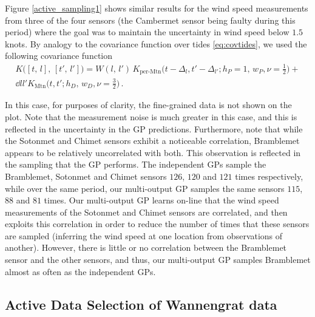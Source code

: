 \documentclass{acmtrans2m}
\newcommand{\dnt}[1]{_{{#1}}}
\newcommand{\Kl}[1]{K_{\text{#1}}}
\begin{document}
Figure \ref{active_sampling1} shows similar results for the wind speed measurements from three of the four sensors (the Cambermet sensor being faulty during this period) where the goal was to maintain the uncertainty in wind speed below $1.5$ knots. By analogy to the covariance function over tides \eqref{eq:covtides}, we used the following covariance function
\begin{multline*} %
 K\bigl([t,\,l],\,[t',\,l']\bigr)={W}(l,\,l')\,
\Kl{per-Mtn}\bigl(t-\Delta_{l},t'-\Delta_{l'};h\dnt{P}=1,\,w_P,\nu=\tfrac{1}{2}\bigr)+
\\
\dd{l}{l'}\Kl{Mtn}\bigl(t,t';h\dnt{D},\,w\dnt{D},\nu=\tfrac{3}{2}\bigr)
\,.
\end{multline*}

In this case, for purposes of clarity, the fine-grained data is not shown on the plot. Note that the measurement noise is much greater in this case, and this is reflected in the uncertainty in the GP predictions. Furthermore, note that while the Sotonmet and Chimet sensors exhibit a noticeable correlation, Bramblemet appears to be relatively uncorrelated with both. This observation is reflected in the sampling that the GP performs. The independent GPs sample the Bramblemet, Sotonmet and Chimet sensors $126$, $120$ and $121$ times respectively, while over the same period, our multi-output GP samples the same sensors $115$, $88$ and $81$ times. Our multi-output GP learns on-line that the wind speed measurements of the Sotonmet and Chimet sensors are correlated, and then exploits this correlation in order to reduce the number of times that these sensors are sampled (inferring the wind speed at one location from observations of another). However, there is little or no correlation between the Bramblemet sensor and the other sensors, and thus, our multi-output GP samples Bramblemet almost as often as the independent GPs.

\subsection{Active Data Selection of Wannengrat data}
\end{document}
